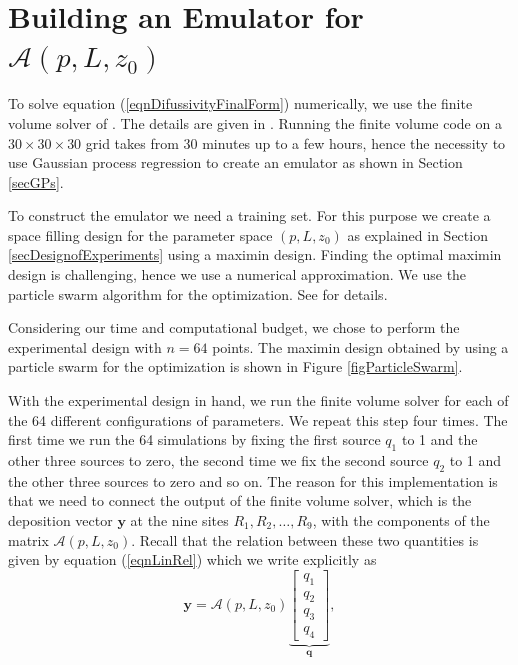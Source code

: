 \documentclass{sfuthesis}
\newcommand{\q}{\textbf{q}}
\newcommand{\y}{\textbf{y}}
\begin{document}
\section{Building an  Emulator for $\mathscr{A}(p,L,z_{0})$}

To solve 
equation (\ref{eqnDifussivityFinalForm}) numerically, we use the finite volume solver of \cite{hosseini2016airborne}. The details
 are given in \cite{hosseini2016airborne}. Running the  finite
volume code on a $30\times 30\times 30$ grid takes from 30 minutes  up to a few hours, hence the 
necessity to use Gaussian process regression to create an emulator as shown in
Section \ref{secGPs}.

To construct the emulator we need a training set. For this purpose we create a space filling design for 
the parameter space $(p,L,z_{0})$ as explained
in Section \ref{secDesignofExperiments} using  a maximin design. 
Finding the optimal  maximin design
is  challenging, hence we
 use a numerical approximation. We use 
the particle swarm algorithm for the optimization. See
 \cite{arora2015optimization} for details.  

Considering our time and computational budget, we  chose to 
perform the experimental design with $n=64$ points. The maximin
design obtained by using a particle swarm for the 
optimization is shown in Figure \ref{figParticleSwarm}.

With the experimental design in hand, we run the finite volume solver 
for each of the 64 different configurations of parameters. We repeat this step four
times. The first time we run the 64 simulations by fixing the first source $q_{1}$ to 1
and the other three sources to zero, the second time we fix the second source $q_{2}$ to 1
and the other three sources to zero and so on. The reason
for this implementation is that we need to connect the output of the finite
volume solver, which is the deposition vector $\y$ at the nine sites $R_{1},R_{2},\ldots,R_{9}$,
with the components of the matrix $\mathscr{A}(p,L,z_{0})$. Recall that the relation between these two quantities 
is given by equation (\ref{eqnLinRel}) which we write explicitly  as
\begin{equation}\label{eqnReminder}
\y=\mathscr{A}(p,L,z_{0})\underbrace{\begin{bmatrix}
q_{1}\\q_{2}\\q_{3}\\q_{4}
\end{bmatrix}}_{\q},
\end{equation}
\end{document}
